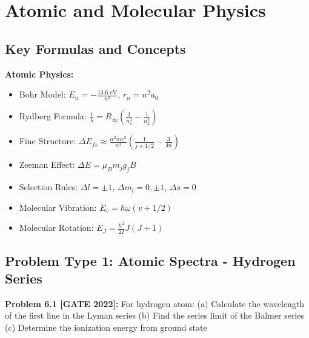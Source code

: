 \documentclass[12pt,a4paper]{article}
\begin{document}
\newpage

\section{Atomic and Molecular Physics}

\subsection{Key Formulas and Concepts}

\begin{theorem}
\textbf{Atomic Physics:}
\begin{itemize}
    \item Bohr Model: $E_n = -\frac{13.6\text{ eV}}{n^2}$, $r_n = n^2 a_0$
    \item Rydberg Formula: $\frac{1}{\lambda} = R_\infty\left(\frac{1}{n_1^2} - \frac{1}{n_2^2}\right)$
    \item Fine Structure: $\Delta E_{fs} \approx \frac{\alpha^2 mc^2}{n^3}\left(\frac{1}{j+1/2} - \frac{3}{4n}\right)$
    \item Zeeman Effect: $\Delta E = \mu_B m_j g_j B$
    \item Selection Rules: $\Delta l = \pm 1$, $\Delta m_l = 0, \pm 1$, $\Delta s = 0$
    \item Molecular Vibration: $E_v = \hbar\omega(v + 1/2)$
    \item Molecular Rotation: $E_J = \frac{\hbar^2}{2I}J(J+1)$
\end{itemize}
\end{theorem}

\subsection{Problem Type 1: Atomic Spectra - Hydrogen Series}

\textbf{Problem 6.1 [GATE 2022]:} For hydrogen atom:
(a) Calculate the wavelength of the first line in the Lyman series
(b) Find the series limit of the Balmer series
(c) Determine the ionization energy from ground state
\end{document}
